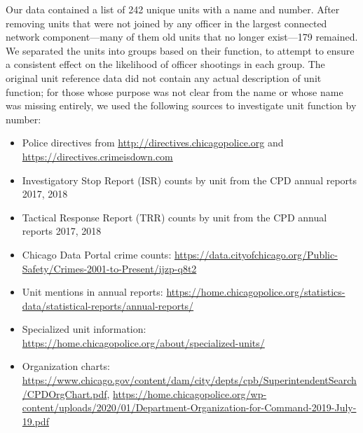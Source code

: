 Our data contained a list of 242 unique units with a name and number. After removing
units that were not joined by any officer in the largest connected network component---many of them
old units that no longer exist---179 remained. We separated the units into groups
based on their function, to attempt to ensure a consistent effect on the likelihood of officer shootings in each group. 
The original unit reference data did not contain any actual description of unit function; for those
whose purpose was not clear from the name or whose name was missing entirely, 
we used the following sources to investigate unit function by number:
\begin{itemize}
\item Police directives from \url{http://directives.chicagopolice.org} and \url{https://directives.crimeisdown.com}
\item Investigatory Stop Report (ISR) counts by unit from the CPD annual reports 2017, 2018
\item Tactical Response Report (TRR) counts by unit from the CPD annual reports 2017, 2018
\item Chicago Data Portal crime counts: \url{https://data.cityofchicago.org/Public-Safety/Crimes-2001-to-Present/ijzp-q8t2}
\item Unit mentions in annual reports: \url{https://home.chicagopolice.org/statistics-data/statistical-reports/annual-reports/}
\item Specialized unit information: \url{https://home.chicagopolice.org/about/specialized-units/}
\item Organization charts: \url{https://www.chicago.gov/content/dam/city/depts/cpb/SuperintendentSearch/CPDOrgChart.pdf},
\url{https://home.chicagopolice.org/wp-content/uploads/2020/01/Department-Organization-for-Command-2019-July-19.pdf }
\end{itemize}

